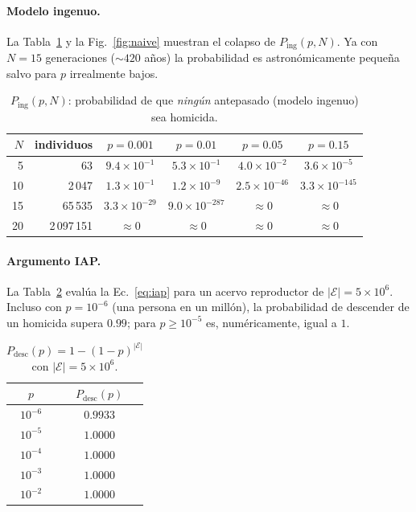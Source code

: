 \documentclass[11pt]{article}
\begin{document}
\paragraph{Modelo ingenuo.} La Tabla~\ref{tab:naive} y la Fig.~\ref{fig:naive}
muestran el colapso de $P_{\text{ing}}(p,N)$. Ya con $N=15$ generaciones
($\sim 420$ a\~nos) la probabilidad es astron\'omicamente peque\~na salvo para
$p$ irrealmente bajos.

\begin{table}[h]
\centering
\caption{$P_{\text{ing}}(p,N)$: probabilidad de que \emph{ning\'un} antepasado
(modelo ingenuo) sea homicida.}
\label{tab:naive}
\begin{tabular}{rrcccc}
\toprule
$N$ & individuos & $p=0{.}001$ & $p=0{.}01$ & $p=0{.}05$ & $p=0{.}15$ \\
\midrule
5  & 63        & $9{.}4\times10^{-1}$ & $5{.}3\times10^{-1}$ & $4{.}0\times10^{-2}$ & $3{.}6\times10^{-5}$ \\
10 & 2\,047    & $1{.}3\times10^{-1}$ & $1{.}2\times10^{-9}$ & $2{.}5\times10^{-46}$ & $3{.}3\times10^{-145}$ \\
15 & 65\,535   & $3{.}3\times10^{-29}$ & $9{.}0\times10^{-287}$ & $\approx 0$ & $\approx 0$ \\
20 & 2\,097\,151 & $\approx 0$ & $\approx 0$ & $\approx 0$ & $\approx 0$ \\
\bottomrule
\end{tabular}
\end{table}

\paragraph{Argumento IAP.} La Tabla~\ref{tab:iap} eval\'ua la
Ec.~\eqref{eq:iap} para un acervo reproductor de $|\mathcal{E}| = 5\times 10^{6}$.
Incluso con $p = 10^{-6}$ (una persona en un mill\'on), la probabilidad de
descender de un homicida supera $0{.}99$; para $p \ge 10^{-5}$ es,
num\'ericamente, igual a $1$.

\begin{table}[h]
\centering
\caption{$P_{\text{desc}}(p) = 1-(1-p)^{|\mathcal{E}|}$ con
$|\mathcal{E}| = 5\times 10^{6}$.}
\label{tab:iap}
\begin{tabular}{cc}
\toprule
$p$ & $P_{\text{desc}}(p)$ \\
\midrule
$10^{-6}$ & $0{.}9933$ \\
$10^{-5}$ & $1{.}0000$ \\
$10^{-4}$ & $1{.}0000$ \\
$10^{-3}$ & $1{.}0000$ \\
$10^{-2}$ & $1{.}0000$ \\
\bottomrule
\end{tabular}
\end{table}
\end{document}
